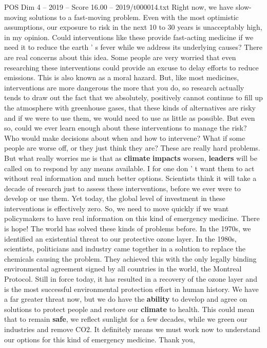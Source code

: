 \begin{textsample}{POS Dim 4 – 2019 – Score 16.00 – 2019/t000014.txt}
Right now, we have slow-moving solutions to a fast-moving problem.
Even with the most optimistic assumptions, our exposure to risk in the next 10 to 30 years is unacceptably high, in my opinion.
Could interventions like these provide fast-acting medicine if we need it to reduce the earth ' s fever while we address its underlying causes?
There are real concerns about this idea.
Some people are very worried that even researching these interventions could provide an excuse to delay efforts to reduce emissions.
This is also known as a moral hazard.
But, like most medicines, interventions are more dangerous the more that you do, so research actually tends to draw out the fact that we absolutely, positively cannot continue to fill up the atmosphere with greenhouse gases, that these kinds of alternatives are risky and if we were to use them, we would need to use as little as possible.
But even so, could we ever learn enough about these interventions to manage the risk?
Who would make decisions about when and how to intervene?
What if some people are worse off, or they just think they are?
These are really hard problems.
But what really worries me is that as \textbf{climate} \textbf{impacts} worsen, \textbf{leaders} will be called on to respond by any means available.
I for one don ' t want them to act without real information and much better options.
Scientists think it will take a decade of research just to assess these interventions, before we ever were to develop or use them.
Yet today, the global level of investment in these interventions is effectively zero.
So, we need to move quickly if we want policymakers to have real information on this kind of emergency medicine.
There is hope!
The world has solved these kinds of problems before.
In the 1970s, we identified an existential threat to our protective ozone layer.
In the 1980s, scientists, politicians and industry came together in a solution to replace the chemicals causing the problem.
They achieved this with the only legally binding environmental agreement signed by all countries in the world, the Montreal Protocol.
Still in force today, it has resulted in a recovery of the ozone layer and is the most successful environmental protection effort in human history.
We have a far greater threat now, but we do have the \textbf{ability} to develop and agree on solutions to protect people and restore our \textbf{climate} to health.
This could mean that to remain \textbf{safe}, we reflect sunlight for a few decades, while we green our industries and remove CO2.
It definitely means we must work now to understand our options for this kind of emergency medicine.
Thank you,

\end{textsample}
